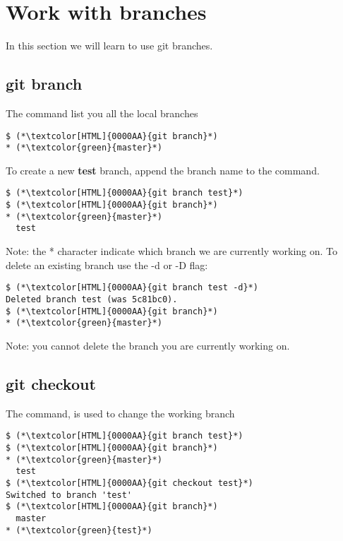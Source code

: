 \section{Work with branches}
\begin{frame}[fragile]
    \slidetitle
In this section we will learn to use git branches.

\end{frame}

\subsection{git branch}
\begin{frame}[fragile]
    \subslidetitle
The  command list you all the local branches
\begin{lstlisting}
$ (*\textcolor[HTML]{0000AA}{git branch}*)
* (*\textcolor{green}{master}*)
\end{lstlisting}

To create a new \textbf{test} branch, append the branch name to the command.
\begin{lstlisting}
$ (*\textcolor[HTML]{0000AA}{git branch test}*)
$ (*\textcolor[HTML]{0000AA}{git branch}*)
* (*\textcolor{green}{master}*)
  test
\end{lstlisting}

Note: the * character indicate which branch we are currently working on.
\newline
To delete an existing branch use the -d or -D flag:
\begin{lstlisting}
$ (*\textcolor[HTML]{0000AA}{git branch test -d}*)
Deleted branch test (was 5c81bc0).
$ (*\textcolor[HTML]{0000AA}{git branch}*)
* (*\textcolor{green}{master}*)
\end{lstlisting}

Note: you cannot delete the branch you are currently working on.
\end{frame}

\subsection{git checkout}
\begin{frame}[fragile]
    \subslidetitle
The  command, is used to change the working branch
\begin{lstlisting}
$ (*\textcolor[HTML]{0000AA}{git branch test}*)
$ (*\textcolor[HTML]{0000AA}{git branch}*)
* (*\textcolor{green}{master}*)
  test
$ (*\textcolor[HTML]{0000AA}{git checkout test}*)
Switched to branch 'test'
$ (*\textcolor[HTML]{0000AA}{git branch}*)
  master
* (*\textcolor{green}{test}*)
\end{lstlisting}

\end{frame}

